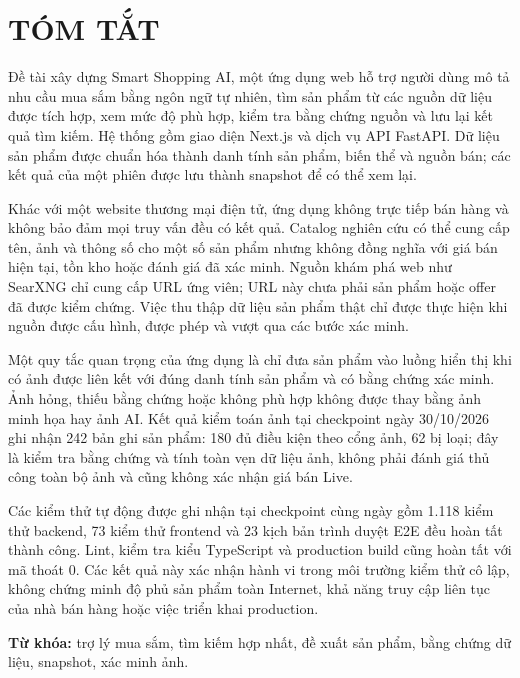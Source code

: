 \chapter*{TÓM TẮT}

Đề tài xây dựng Smart Shopping AI, một ứng dụng web hỗ trợ người dùng mô tả nhu cầu mua sắm bằng ngôn ngữ tự nhiên, tìm sản phẩm từ các nguồn dữ liệu được tích hợp, xem mức độ phù hợp, kiểm tra bằng chứng nguồn và lưu lại kết quả tìm kiếm. Hệ thống gồm giao diện Next.js và dịch vụ API FastAPI. Dữ liệu sản phẩm được chuẩn hóa thành danh tính sản phẩm, biến thể và nguồn bán; các kết quả của một phiên được lưu thành snapshot để có thể xem lại.

Khác với một website thương mại điện tử, ứng dụng không trực tiếp bán hàng và không bảo đảm mọi truy vấn đều có kết quả. Catalog nghiên cứu có thể cung cấp tên, ảnh và thông số cho một số sản phẩm nhưng không đồng nghĩa với giá bán hiện tại, tồn kho hoặc đánh giá đã xác minh. Nguồn khám phá web như SearXNG chỉ cung cấp URL ứng viên; URL này chưa phải sản phẩm hoặc offer đã được kiểm chứng. Việc thu thập dữ liệu sản phẩm thật chỉ được thực hiện khi nguồn được cấu hình, được phép và vượt qua các bước xác minh.

Một quy tắc quan trọng của ứng dụng là chỉ đưa sản phẩm vào luồng hiển thị khi có ảnh được liên kết với đúng danh tính sản phẩm và có bằng chứng xác minh. Ảnh hỏng, thiếu bằng chứng hoặc không phù hợp không được thay bằng ảnh minh họa hay ảnh AI. Kết quả kiểm toán ảnh tại checkpoint ngày 30/10/2026 ghi nhận 242 bản ghi sản phẩm: 180 đủ điều kiện theo cổng ảnh, 62 bị loại; đây là kiểm tra bằng chứng và tính toàn vẹn dữ liệu ảnh, không phải đánh giá thủ công toàn bộ ảnh và cũng không xác nhận giá bán Live.

Các kiểm thử tự động được ghi nhận tại checkpoint cùng ngày gồm 1.118 kiểm thử backend, 73 kiểm thử frontend và 23 kịch bản trình duyệt E2E đều hoàn tất thành công. Lint, kiểm tra kiểu TypeScript và production build cũng hoàn tất với mã thoát 0. Các kết quả này xác nhận hành vi trong môi trường kiểm thử cô lập, không chứng minh độ phủ sản phẩm toàn Internet, khả năng truy cập liên tục của nhà bán hàng hoặc việc triển khai production.

\noindent\textbf{Từ khóa:} trợ lý mua sắm, tìm kiếm hợp nhất, đề xuất sản phẩm, bằng chứng dữ liệu, snapshot, xác minh ảnh.
